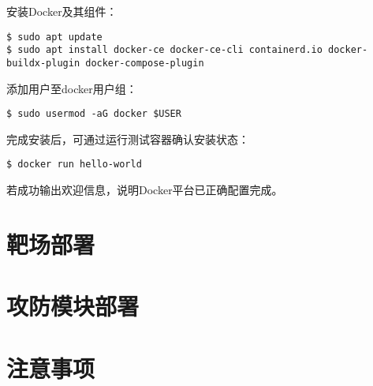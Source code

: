 \documentclass[lang=cn,10pt]{elegantbook}
\begin{document}
安装Docker及其组件：

\begin{verbatim}
$ sudo apt update
$ sudo apt install docker-ce docker-ce-cli containerd.io docker-buildx-plugin docker-compose-plugin
\end{verbatim}

添加用户至docker用户组：

\begin{verbatim}
$ sudo usermod -aG docker $USER
\end{verbatim}

完成安装后，可通过运行测试容器确认安装状态：

\begin{verbatim}
$ docker run hello-world
\end{verbatim}

若成功输出欢迎信息，说明Docker平台已正确配置完成。


\section{靶场部署}


\section{攻防模块部署}


\section{注意事项}





\end{document}
